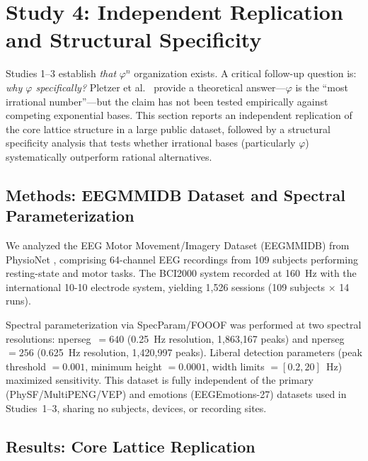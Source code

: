 \documentclass[11pt,a4paper]{article}
\newcommand{\phisym}{\varphi}
\begin{document}
\section{Study 4: Independent Replication and Structural Specificity}
\label{sec:study4}

Studies 1--3 establish \textit{that} $\phisym^n$ organization exists. A critical follow-up question is: \textit{why $\phisym$ specifically?} Pletzer et al.\ \parencite{pletzer2010golden} provide a theoretical answer---$\phisym$ is the ``most irrational number''---but the claim has not been tested empirically against competing exponential bases. This section reports an independent replication of the core lattice structure in a large public dataset, followed by a structural specificity analysis that tests whether irrational bases (particularly $\phisym$) systematically outperform rational alternatives.

\subsection{Methods: EEGMMIDB Dataset and Spectral Parameterization}
\label{sec:study4_methods}

We analyzed the EEG Motor Movement/Imagery Dataset (EEGMMIDB) from PhysioNet \parencite{goldberger2000physiobank, schalk2004bci2000}, comprising 64-channel EEG recordings from 109 subjects performing resting-state and motor tasks. The BCI2000 system recorded at 160~Hz with the international 10-10 electrode system, yielding 1,526 sessions (109 subjects $\times$ 14 runs).

Spectral parameterization via SpecParam/FOOOF \parencite{donoghue2020fooof} was performed at two spectral resolutions: nperseg~$= 640$ (0.25~Hz resolution, 1,863,167 peaks) and nperseg~$= 256$ (0.625~Hz resolution, 1,420,997 peaks). Liberal detection parameters (peak threshold $= 0.001$, minimum height $= 0.0001$, width limits $= [0.2, 20]$~Hz) maximized sensitivity. This dataset is fully independent of the primary (PhySF/MultiPENG/VEP) and emotions (EEGEmotions-27) datasets used in Studies~1--3, sharing no subjects, devices, or recording sites.

\subsection{Results: Core Lattice Replication}
\label{sec:study4_replication}
\end{document}

